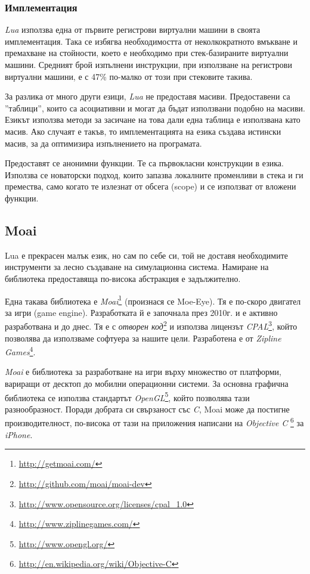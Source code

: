 		\subsubsection{Имплементация}
		
			\emph{Lua} използва една от първите регистрови виртуални машини в своята имплементация. Така се избягва
			необходимостта от неколкократното вмъкване и премахване на стойности, 
			което е необходимо при стек-базираните виртуални машини. Средният брой изпълнени инструкции, при използване
			на регистрови виртуални машини, е с 47\% по-малко от този при стековите такива. \cite{Khan}
			
			За разлика от много други езици, \emph{Lua} не предоставя масиви. Предоставени са ''таблици'', които
			са асоциативни и могат да бъдат използвани подобно на масиви. Езикът използва методи за
			засичане на това дали една таблица е използвана като масив. Ако случаят е такъв, то имплементацията
			на езика създава истински масив, за да оптимизира изпълнението на програмата.
			
			Предоставят се анонимни функции. Те са първокласни конструкции в езика. Използва се новаторски подход,
			които запазва локалните променливи в стека и ги премества, само когато те излезнат от обсега (scope) и
			се използват от вложени функции.
	
	\subsection{Moai}
	
		Lua е прекрасен малък език, но сам по себе си, той не доставя необходимите инструменти
		за лесно създаване на симулационна система. Намиране на библиотека предоставяща по-висока
		абстракция е задължително.
		
		Една такава библиотека е \emph{Moai}\footnote{\url{http://getmoai.com/}} (произнася се Moe-Eye).
		Тя е по-скоро двигател за игри (game engine).
		Разработката й е започнала през 2010г. и е активно разработвана и до днес. 
		Тя е с \emph{отворен код}\footnote{\url{http://github.com/moai/moai-dev}}
		и използва лицензът \emph{CPAL}\footnote{\url{http://www.opensource.org/licenses/cpal_1.0}}, който
		позволява да използваме софтуера за нашите цели. 
		Разработена е от \emph{Zipline Games}\footnote{\url{http://www.ziplinegames.com/}}.						
		
		\emph{Moai} е библиотека за разработване на игри върху множество от платформи, вариращи от десктоп до
		мобилни операционни системи. За основна графична библиотека се използва стандартът 
		\emph{OpenGL}\footnote{\url{http://www.opengl.org/}}, който позволява тази разнообразност.
		Поради добрата си свързаност със \emph{C}, Moai може да постигне производителност, по-висока
		от тази на приложения написани на  \emph{Objective C}
		\footnote{\url{http://en.wikipedia.org/wiki/Objective-C}} за \emph{iPhone}.
		
